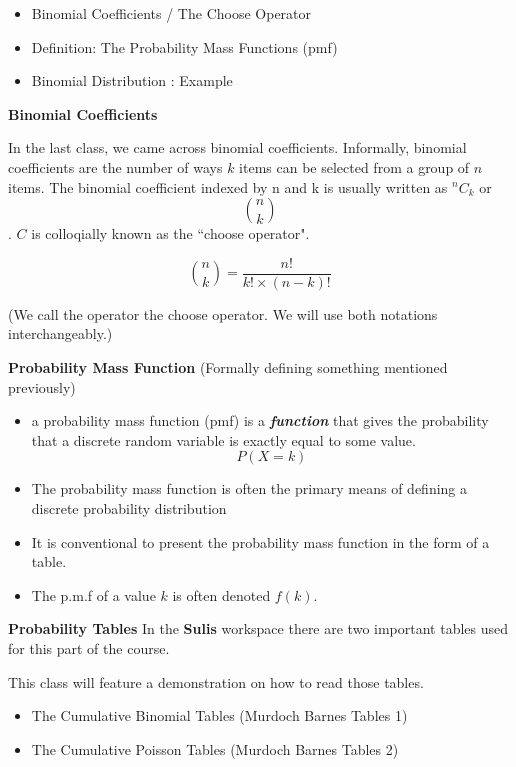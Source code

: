 \documentclass[]{report}
\begin{document}

{
\begin{itemize}
\item  Binomial Coefficients / The Choose Operator
\item  Definition: The Probability Mass Functions (pmf)
\item  Binomial Distribution : Example
\end{itemize}
}
{
\textbf{Binomial Coefficients}

In the last class, we came across binomial coefficients. Informally, binomial coefficients are the number of ways $k$ items can be selected from a group of $n$ items. 
The binomial coefficient indexed by n and k is usually written as $^nC_k$ or
\[ {n \choose k}\].
$C$ is colloqially known as the ``choose operator".

\[ {n \choose k} = \frac{n!}{k! \times (n-k)!} \]

(We call the operator the choose operator. We will use both notations interchangeably.)


{
\textbf{Probability Mass Function}
(Formally defining something mentioned previously)
\begin{itemize} \item  a probability mass function (pmf) is a \textbf{\emph{function}}
that gives the probability that a discrete random variable is exactly equal to some
value.
\[P(X=k)\]
\item  The probability mass function is often the primary means of defining a discrete
probability distribution
\item  It is conventional to present the probability mass function in the form of a table.
\item  The p.m.f of a value $k$ is often denoted $f(k)$.
\end{itemize}
}
{
\textbf{Probability Tables}
In the \textbf{Sulis} workspace there are two important tables used for this part of the course.


This class will feature a demonstration on how to read those tables.
\begin{itemize}
\item  The Cumulative Binomial Tables (Murdoch Barnes Tables 1)
\item  The Cumulative Poisson Tables (Murdoch Barnes Tables 2)
\end{itemize}

}}
\end{document}
